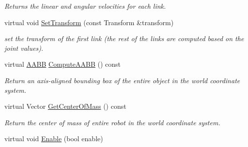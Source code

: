 \begin{DoxyCompactItemize}
\begin{DoxyCompactList}\small\item\em Returns the linear and angular velocities for each link. \item\end{DoxyCompactList}\item 
virtual void \hyperlink{classOpenRAVE_1_1KinBody_a92abef33e0bc4eca1756178c31e18645}{SetTransform} (const Transform \&transform)
\begin{DoxyCompactList}\small\item\em set the transform of the first link (the rest of the links are computed based on the joint values). \item\end{DoxyCompactList}\item 
\hypertarget{classOpenRAVE_1_1KinBody_a19007e9a11f60fac50720cd38a4d6ede}{
virtual \hyperlink{classOpenRAVE_1_1geometry_1_1aabb}{AABB} \hyperlink{classOpenRAVE_1_1KinBody_a19007e9a11f60fac50720cd38a4d6ede}{ComputeAABB} () const }
\label{classOpenRAVE_1_1KinBody_a19007e9a11f60fac50720cd38a4d6ede}

\begin{DoxyCompactList}\small\item\em Return an axis-\/aligned bounding box of the entire object in the world coordinate system. \item\end{DoxyCompactList}\item 
\hypertarget{classOpenRAVE_1_1KinBody_adfe385b3300ee3f399e9a71837409054}{
virtual Vector \hyperlink{classOpenRAVE_1_1KinBody_adfe385b3300ee3f399e9a71837409054}{GetCenterOfMass} () const }
\label{classOpenRAVE_1_1KinBody_adfe385b3300ee3f399e9a71837409054}

\begin{DoxyCompactList}\small\item\em Return the center of mass of entire robot in the world coordinate system. \item\end{DoxyCompactList}\item 
\hypertarget{classOpenRAVE_1_1KinBody_a93204280b89842474930316675ce9f07}{
virtual void \hyperlink{classOpenRAVE_1_1KinBody_a93204280b89842474930316675ce9f07}{Enable} (bool enable)}
\label{classOpenRAVE_1_1KinBody_a93204280b89842474930316675ce9f07}


\end{DoxyCompactItemize}
